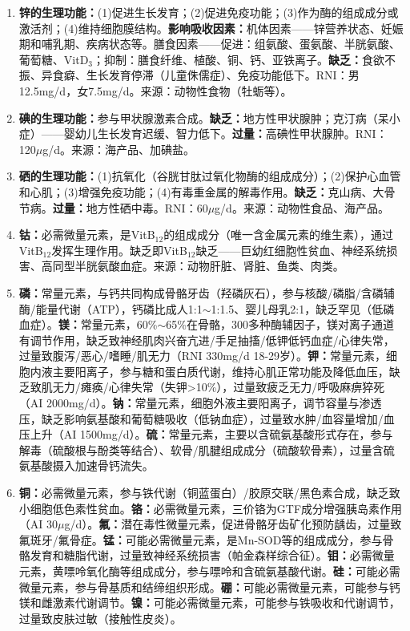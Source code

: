 {\begin{enumerate}[leftmargin=*, itemsep=5pt]
    \item \textbf{锌的生理功能：}(1)促进生长发育；(2)促进免疫功能；(3)作为酶的组成成分或激活剂；(4)维持细胞膜结构。\textbf{影响吸收因素：}机体因素——锌营养状态、妊娠期和哺乳期、疾病状态等。膳食因素——促进：组氨酸、蛋氨酸、半胱氨酸、葡萄糖、VitD$_3$；抑制：膳食纤维、植酸、铜、钙、亚铁离子。\textbf{缺乏：}食欲不振、异食癖、生长发育停滞（儿童侏儒症）、免疫功能低下。RNI：男12.5mg/d，女7.5mg/d。来源：动物性食物（牡蛎等）。

    \item \textbf{碘的生理功能：}参与甲状腺激素合成。\textbf{缺乏：}地方性甲状腺肿；克汀病（呆小症）——婴幼儿生长发育迟缓、智力低下。\textbf{过量：}高碘性甲状腺肿。RNI：120$\mu$g/d。来源：海产品、加碘盐。

    \item \textbf{硒的生理功能：}(1)抗氧化（谷胱甘肽过氧化物酶的组成成分）；(2)保护心血管和心肌；(3)增强免疫功能；(4)有毒重金属的解毒作用。\textbf{缺乏：}克山病、大骨节病。\textbf{过量：}地方性硒中毒。RNI：60$\mu$g/d。来源：动物性食品、海产品。

    \item \textbf{钴：}必需微量元素，是VitB$_{12}$的组成成分（唯一含金属元素的维生素），通过VitB$_{12}$发挥生理作用。缺乏即VitB$_{12}$缺乏——巨幼红细胞性贫血、神经系统损害、高同型半胱氨酸血症。来源：动物肝脏、肾脏、鱼类、肉类。

    \item \textbf{磷：}常量元素，与钙共同构成骨骼牙齿（羟磷灰石），参与核酸/磷脂/含磷辅酶/能量代谢（ATP），钙磷比成人1:1$\sim$1:1.5、婴儿母乳2:1，缺乏罕见（低磷血症）。\textbf{镁：}常量元素，60\%$\sim$65\%在骨骼，300多种酶辅因子，镁对离子通道有调节作用，缺乏致神经肌肉兴奋亢进/手足抽搐/低钾低钙血症/心律失常，过量致腹泻/恶心/嗜睡/肌无力（RNI 330mg/d 18-29岁）。\textbf{钾：}常量元素，细胞内液主要阳离子，参与糖和蛋白质代谢，维持心肌正常功能及降低血压，缺乏致肌无力/瘫痪/心律失常（失钾>10\%），过量致疲乏无力/呼吸麻痹猝死（AI 2000mg/d）。\textbf{钠：}常量元素，细胞外液主要阳离子，调节容量与渗透压，缺乏影响氨基酸和葡萄糖吸收（低钠血症），过量致水肿/血容量增加/血压上升（AI 1500mg/d）。\textbf{硫：}常量元素，主要以含硫氨基酸形式存在，参与解毒（硫酸根与酚类等结合）、软骨/肌腱组成成分（硫酸软骨素），过量含硫氨基酸摄入加速骨钙流失。

    \item \textbf{铜：}必需微量元素，参与铁代谢（铜蓝蛋白）/胶原交联/黑色素合成，缺乏致小细胞低色素性贫血。\textbf{铬：}必需微量元素，三价铬为GTF成分增强胰岛素作用（AI 30$\mu$g/d）。\textbf{氟：}潜在毒性微量元素，促进骨骼牙齿矿化预防龋齿，过量致氟斑牙/氟骨症。\textbf{锰：}可能必需微量元素，是Mn-SOD等的组成成分，参与骨骼发育和糖脂代谢，过量致神经系统损害（帕金森样综合征）。\textbf{钼：}必需微量元素，黄嘌呤氧化酶等组成成分，参与嘌呤和含硫氨基酸代谢。\textbf{硅：}可能必需微量元素，参与骨基质和结缔组织形成。\textbf{硼：}可能必需微量元素，可能参与钙镁和雌激素代谢调节。\textbf{镍：}可能必需微量元素，可能参与铁吸收和代谢调节，过量致皮肤过敏（接触性皮炎）。
\end{enumerate}
}
\newpage
